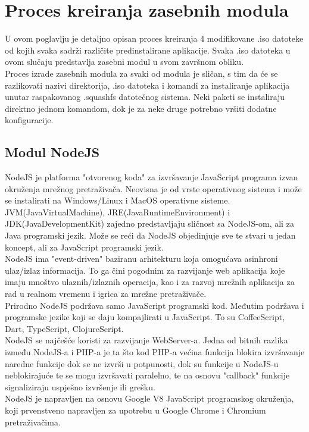 \documentclass[12pt,vi]{mitthesis}
\begin{document}
\chapter*{Proces kreiranja zasebnih modula}
\indent
U ovom poglavlju je detaljno opisan proces kreiranja 4 modifikovane .iso datoteke od kojih svaka sadrži različite predinstalirane aplikacije. Svaka .iso datoteka u ovom slučaju predstavlja zasebni modul u svom završnom obliku.\\ 
Proces izrade zasebnih modula za svaki od modula je sličan, s tim da će se razlikovati nazivi direktorija, .iso datoteka i komandi za instaliranje aplikacija unutar raspakovanog .squashfs datotečnog sistema. Neki paketi se instaliraju direktno jednom komandom, dok je za neke druge potrebno vršiti dodatne konfiguracije.
\newpage
\section*{Modul NodeJS}
\indent
NodeJS je platforma "otvorenog koda" za izvršavanje JavaScript programa izvan okruženja mrežnog pretraživača. Neovisna je od vrste operativnog sistema i može se instalirati na Windows/Linux i MacOS operativne sisteme. JVM(JavaVirtualMachine), JRE(JavaRuntimeEnvironment) i JDK(JavaDevelopmentKit) zajedno predstavljaju sličnost sa NodeJS-om, ali za Java programski jezik. Može se reći da NodeJS objedinjuje sve te stvari u jedan koncept, ali za JavaScript programski jezik.\\
NodeJS ima "event-driven" baziranu arhitekturu koja omogućava asinhroni ulaz/izlaz informacija. To ga čini pogodnim za razvijanje web aplikacija koje imaju mnoštvo ulaznih/izlaznih operacija, kao i za razvoj mrežnih aplikacija za rad u realnom vremenu i igrica za mrežne pretraživače.\\
Prirodno NodeJS podržava samo JavaScript programski kod. Međutim podržava i programske jezike koji se daju kompajlirati u JavaScript. To su CoffeeScript, Dart, TypeScript, ClojureScript.\\
NodeJS se najčešće koristi za razvijanje WebServer-a. Jedna od bitnih razlika između NodeJS-a i PHP-a je ta što kod PHP-a većina funkcija blokira izvršavanje naredne funkcije dok se ne izvrši u potpunosti, dok su funkcije u NodeJS-u neblokirajuće te se mogu izvršavati paralelno, te na osnovu "callback" funkcije signaliziraju uspješno izvršenje ili grešku.\\
NodeJS je napravljen na osnovu Google V8 JavaScript programskog okruženja, koji prvenstveno napravljen za upotrebu u Google Chrome i Chromium pretraživačima.
\end{document}
